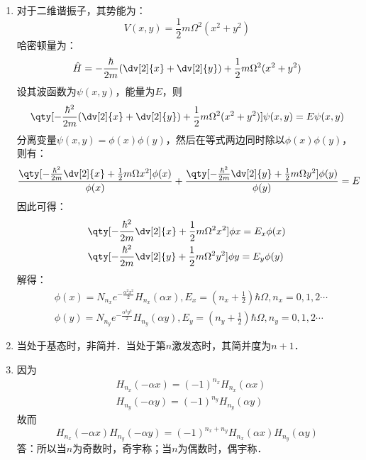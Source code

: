 \begin{enumerate}
\item 对于二维谐振子，其势能为：
\begin{equation}
V(x,y)=\frac{1}{2}m\Omega^{2}(x^{2}+y^{2})
\end{equation}
哈密顿量为：
\begin{equation}
\hat{H}=-\frac{\hbar}{2m}(\dv[2]{x}+\dv[2]{y})+\frac{1}{2}m\Omega^{2}(x^{2}+y^{2})
\end{equation}
设其波函数为$\psi(x,y)$，能量为$E$，则
\begin{equation}
\qty[ -\frac{\hbar^{2}}{2m}(\dv[2]{x} + \dv[2]{y})+\frac{1}{2}m\Omega^{2}(x^{2}+y^{2})]\psi(x,y)=E\psi(x,y)
\end{equation}
分离变量$\psi(x,y)=\phi(x)\phi(y)$，然后在等式两边同时除以$\phi(x)\phi(y)$，则有：
\begin{equation}
\frac{\qty[-\frac{\hbar^{2}}{2m}\dv[2]{x}+\frac{1}{2}m\Omega x^{2}]\phi(x)}{\phi(x)}+\frac{\qty[-\frac{\hbar^{2}}{2m}\dv[2]{y}+\frac{1}{2}m\Omega y^{2}]\phi(y)}{\phi(y)}=E
\end{equation}
因此可得：
\begin{align}
&\qty[-\frac{\hbar^{2}}{2m}\dv[2]{x}+\frac{1}{2}m\Omega^{2}x^{2}]\phi{x}=E_{x}\phi(x)\\
&\qty[-\frac{\hbar^{2}}{2m}\dv[2]{y}+\frac{1}{2}m\Omega^{2}y^{2}]\phi{y}=E_{y}\phi(y)
\end{align}
解得：
\begin{align}
&\phi(x)=N_{n_{x}}e^{-\frac{\alpha^{2}x^{2}}{2}}H_{n_{x}}(\alpha x),E_{x}=(n_{x}+\frac{1}{2})\hbar \Omega,n_{x}=0,1,2\cdots \\
&\phi(y)=N_{n_{y}}e^{-\frac{\alpha^{2}y^{2}}{2}}H_{n_{y}}(\alpha y),E_{y}=(n_{y}+\frac{1}{2})\hbar \Omega,n_{y}=0,1,2\cdots
\end{align}
\item 当处于基态时，非简并．当处于第$n$激发态时，其简并度为$n+1$．
\item 因为
\begin{align}
&H_{n_x}(-\alpha x)=(-1)^{n_x}H_{n_x}(\alpha x) \\
&H_{n_y}(-\alpha y)=(-1)^{n_y}H_{n_y}(\alpha y)
\end{align}
故而
\begin{equation}
H_{n_x}(-\alpha x)H_{n_y}(-\alpha y)=(-1)^{n_x + n_y}H_{n_x}(\alpha x)H_{n_y}(\alpha y)
\end{equation}
答：所以当$n$为奇数时，奇宇称；当$n$为偶数时，偶宇称．
\end{enumerate}